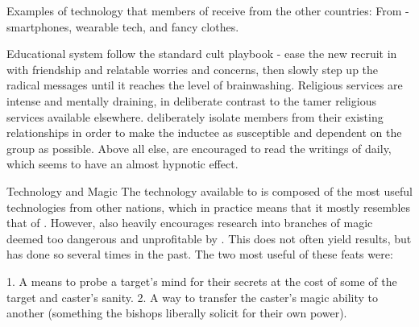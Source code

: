 \documentclass[blue]{GL2020}
\begin{document}
Examples of technology that members of \pCult{} receive from the other countries:
From \pTech{} - smartphones, wearable tech, and fancy clothes.



Educational system
\pCult follow the standard cult playbook - ease the new recruit in with friendship and relatable worries and concerns, then slowly step up the radical messages until it reaches the level of brainwashing. Religious services are intense and mentally draining, in deliberate contrast to the tamer religious services available elsewhere. \pCult deliberately isolate members from their existing relationships in order to make the inductee as susceptible and dependent on the group as possible. Above all else, \pCult are encouraged to read the writings of \cCultLeader daily, which seems to have an almost hypnotic effect.

Technology and Magic
The technology available to \pCult{} is composed of the most useful technologies from other nations, which in practice means that it mostly resembles that of \pTech{}. However, \pCult{} also heavily encourages research into branches of magic deemed too dangerous and unprofitable by \pTech{}. This does not often yield results, but has done so several times in the past. The two most useful of these feats were: 

1. A means to probe a target's mind for their secrets at the cost of some of the target and caster's sanity. 
2. A way to transfer the caster's magic ability to another (something the bishops liberally solicit for their own power).
\end{document}
